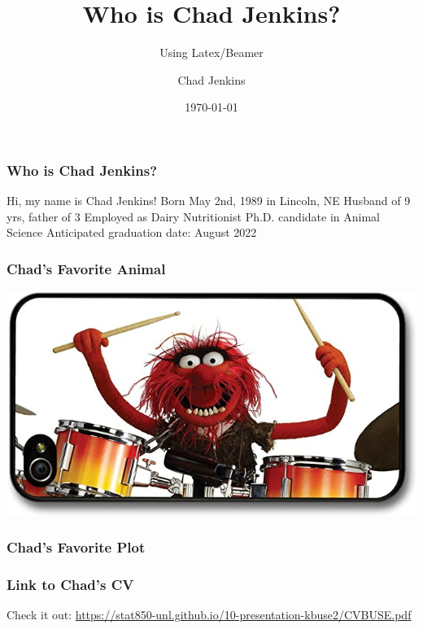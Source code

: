 \documentclass{beamer}
\title{Who is Chad Jenkins?}
\subtitle{Using Latex/Beamer}
\author{Chad Jenkins}
\institute{University of Nebraska}
\date{\today}
\begin{document}
\begin{frame}
\titlepage
\end{frame}

\begin{frame}
\frametitle{Who is Chad Jenkins?}
\begin{outline}
\1 Hi, my name is Chad Jenkins!
\2 Born May 2nd, 1989 in Lincoln, NE
\2 Husband of 9 yrs, father of 3
\2 Employed as Dairy Nutritionist
\2 Ph.D. candidate in Animal Science
\3 Anticipated graduation date: August 2022
\end{outline}
\end{frame}

\begin{frame}
\frametitle{Chad's Favorite Animal}
\includegraphics[scale=0.5]{animal}
\end{frame}

\begin{frame}
\frametitle{Chad's Favorite Plot}
\end{frame}

\begin{frame}
\frametitle{Link to Chad's CV}
Check it out: \url{https://stat850-unl.github.io/10-presentation-kbuse2/CVBUSE.pdf}
\end{frame}
\end{document}
